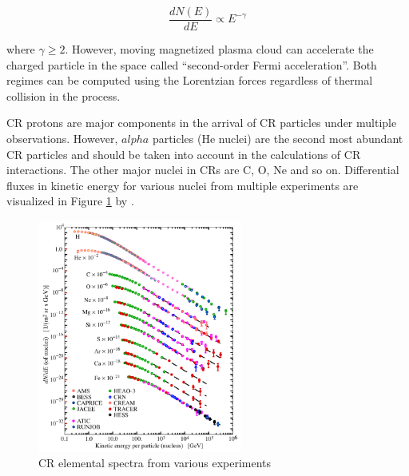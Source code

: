 \begin{equation}
    \frac{dN(E)}{dE} \propto E^{-\gamma}
    \label{eq:fermi_powerlaw}
\end{equation}

where $\gamma \geq 2$.
However, moving magnetized plasma cloud can accelerate the charged
particle in the space called ``second-order Fermi acceleration''.
Both regimes can be computed using the Lorentzian forces regardless of
thermal collision in the process.

CR protons are major components in the arrival of CR particles
under multiple observations.
However,
$alpha$ particles (He nuclei) are the second most abundant CR
particles and should be taken into account in the calculations
of CR interactions.
The other major nuclei in CRs
are C, O, Ne and so on. 
Differential fluxes in kinetic energy for various nuclei from
multiple experiments are visualized in Figure \ref{fig:cr_composition}
by \cite{review_particle_physics2012}.

\begin{figure}[h!]
    \centering
    \includegraphics[width=0.6\textwidth]{content/literature_review/figures/cr_composition.png}
    \caption{CR elemental spectra from various experiments \citep{review_particle_physics2012}}
    \label{fig:cr_composition}
\end{figure}


